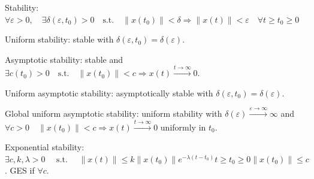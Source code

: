 \begin{definition}
    Stability: $\forall \varepsilon>0, \quad \exists \delta\left(\varepsilon, t_{0}\right)>0 \quad \text{s.t.} \quad \left\|x\left(t_{0}\right)\right\|<\delta \Rightarrow\|x(t)\|<\varepsilon \quad \forall t \geq t_{0} \geq 0$
\end{definition}
\begin{definition}
    Uniform stability: stable with $\delta\left(\varepsilon, t_{0}\right) = \delta\left(\varepsilon\right)$.
\end{definition}
\begin{definition}
    Asymptotic stability: stable and $\exists c\left(t_{0}\right)>0 \quad \text {s.t.} \quad \left\|x\left(t_{0}\right)\right\|<c \Rightarrow x(t) \stackrel{t \rightarrow \infty}{\longrightarrow} 0$.
\end{definition}
\begin{definition}
    Uniform asymptotic stability: asymptotically stable with $\delta\left(\varepsilon, t_{0}\right) = \delta\left(\varepsilon\right)$.
\end{definition}
\begin{definition}
    Global uniform asymptotic stability: uniform stability with $\delta(\varepsilon) \stackrel{\varepsilon \rightarrow \infty}{\longrightarrow} \infty$ and $\forall c>0 \quad\left\|x\left(t_{0}\right)\right\|<c \Rightarrow x(t) \stackrel{t \rightarrow \infty}{\longrightarrow} 0$ uniformly in $t_0$.
\end{definition}
\begin{definition}
    Exponential stability: $\exists c, k, \lambda>0 \quad \text { s.t. } \quad\|x(t)\| \leq k\left\|x\left(t_{0}\right)\right\| e^{-\lambda\left(t-t_{0}\right)} t \geq t_{0} \geq 0 \left\|x\left(t_{0}\right)\right\| \leq c$.
    GES if $\forall c$.
\end{definition}

